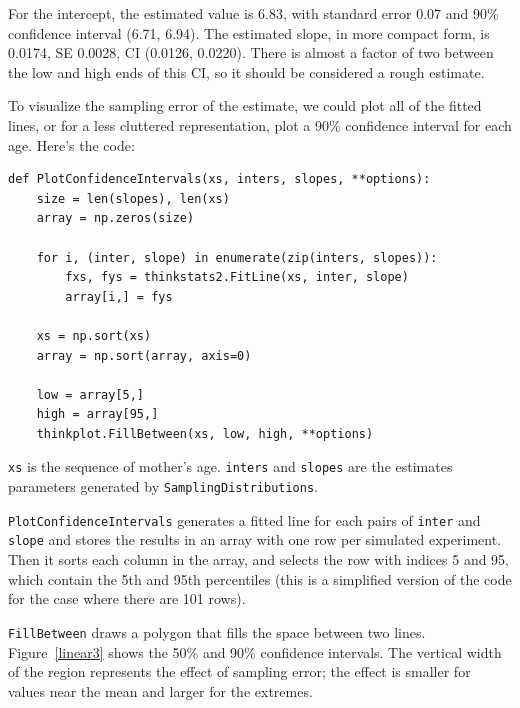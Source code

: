\documentclass[12pt]{book}
\begin{document}
For the intercept, the estimated value is 6.83, with standard error
0.07 and 90\% confidence interval (6.71, 6.94).  The estimated slope, in
more compact form, is 0.0174, SE 0.0028, CI (0.0126, 0.0220).
There is almost a factor of two between the low and high ends of
this CI, so it should be considered a rough estimate.


To visualize the sampling error of the estimate, we could plot
all of the fitted lines, or for a less cluttered representation,
plot a 90\% confidence interval for each age.  Here's the code:

\begin{verbatim}
def PlotConfidenceIntervals(xs, inters, slopes, **options):
    size = len(slopes), len(xs)
    array = np.zeros(size)

    for i, (inter, slope) in enumerate(zip(inters, slopes)):
        fxs, fys = thinkstats2.FitLine(xs, inter, slope)
        array[i,] = fys

    xs = np.sort(xs)
    array = np.sort(array, axis=0)
    
    low = array[5,]
    high = array[95,]
    thinkplot.FillBetween(xs, low, high, **options)
\end{verbatim}

{\tt xs} is the sequence of mother's age.  {\tt inters} and {\tt slopes}
are the estimates parameters generated by {\tt SamplingDistributions}.

{\tt PlotConfidenceIntervals} generates a fitted line for each pairs
of {\tt inter} and {\tt slope} and stores the results in an array with
one row per simulated experiment.  Then it sorts each column in the
array, and selects the row with indices 5 and 95, which contain the
5th and 95th percentiles (this is a simplified version of the code for
the case where there are 101 rows).

{\tt FillBetween} draws a polygon that fills the space between two
lines.  Figure~\ref{linear3} shows the 50\% and 90\% confidence
intervals.  The vertical width of the region represents the effect of
sampling error; the effect is smaller for values near the mean and
larger for the extremes.
\end{document}
